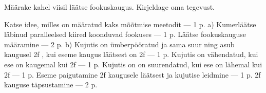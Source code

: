 
Määrake kahel viisil läätse fookuskaugus. Kirjeldage oma tegevust.

\hint

\solu
Katse idee, milles on määratud kaks mõõtmise meetodit --- 1 p. a) Kumerläätse läbinud paralleelsed kiired koonduvad fookuses --- 1 p. Läätse fookuskauguse määramine --- 2 p. b) Kujutis on ümberpööratud ja sama suur ning asub kaugusel 2f , kui eseme kaugus läätsest on 2f --- 1 p. Kujutis on vähendatud, kui ese on kaugemal kui 2f --- 1 p. Kujutis on on suurendatud, kui ese on lähemal kui 2f --- 1 p. Eseme paigutamine 2f kaugusele läätsest ja kujutise leidmine --- 1 p. 2f kauguse täpsustamine --- 2 p.
\probend
